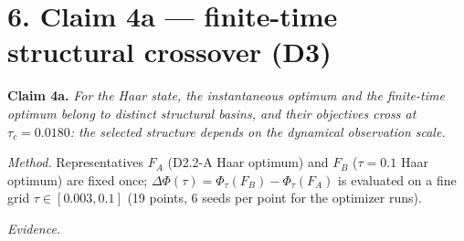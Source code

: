 \documentclass[
]{article}
\begin{document}
\section{6. Claim 4a --- finite-time structural crossover
(D3)}\label{claim-4a-finite-time-structural-crossover-d3}

\textbf{Claim 4a.} \emph{For the Haar state, the instantaneous optimum
and the finite-time optimum belong to distinct structural basins, and
their objectives cross at \(\tau_c = 0.0180\): the selected structure
depends on the dynamical observation scale.}

\emph{Method.} Representatives \(F_A\) (D2.2-A Haar optimum) and \(F_B\)
(\(\tau=0.1\) Haar optimum) are fixed once; \(\Delta\Phi(\tau) =
\Phi_\tau(F_B) - \Phi_\tau(F_A)\) is evaluated on a fine grid \(\tau \in
[0.003, 0.1]\) (19 points, 6 seeds per point for the optimizer runs).

\emph{Evidence.}
\end{document}
